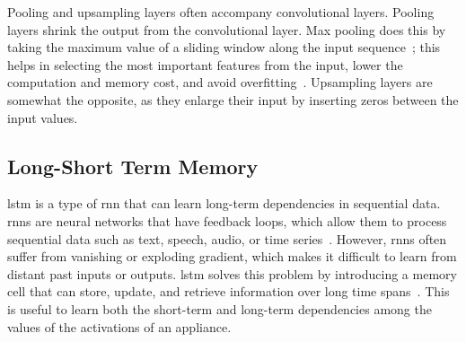 \newpage

Pooling and upsampling layers often accompany convolutional layers. Pooling layers shrink the output from the convolutional layer. Max pooling does this by taking the maximum value of a sliding window along the input sequence~\parencite{ahmadDeepLearningMultiscale2019}; this helps in selecting the most important features from the input, lower the computation and memory cost, and avoid overfitting~\parencite{zhangDiveDeepLearning2023,masciStackedConvolutionalAutoEncoders2011}. Upsampling layers are somewhat the opposite, as they enlarge their input by inserting zeros between the input values.

\subsection{Long-Short Term Memory}

\acrfull{lstm} is a type of \acrfull{rnn} that can learn long-term dependencies in sequential data. \acrshort{rnn}s are neural networks that have feedback loops, which allow them to process sequential data such as text, speech, audio, or time series~\parencite{ahmadDeepLearningMultiscale2019}. However, \acrshort{rnn}s often suffer from vanishing or exploding gradient, which makes it difficult to learn from distant past inputs or outputs. \acrshort{lstm} solves this problem by introducing a memory cell that can store, update, and retrieve information over long time spans~\parencite{hochreiterLongShortTermMemory1997}. This is useful to learn both the short-term and long-term dependencies among the values of the activations of an appliance.

